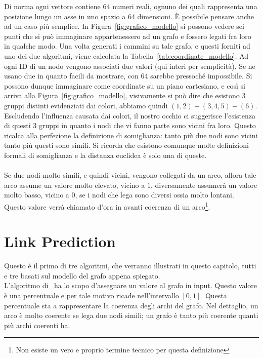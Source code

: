 Di norma ogni vettore contiene $64$ numeri reali, ognuno dei quali rappresenta una posizione lungo un asse in uno spazio a $64$ dimensioni. È possibile pensare anche ad un caso più semplice. In Figura~\ref{fig:grafico_modello} si possono vedere sei punti che si può immaginare appartenessero ad un grafo e fossero legati fra loro in qualche modo. Una volta generati i cammini su tale grafo, e questi forniti ad uno dei due algoritmi, viene calcolata la Tabella~\ref{tab:coordinate_modello}. Ad ogni ID di un nodo vengono associati due valori (qui interi per semplicità). Se ne usano due in quanto facili da mostrare, con $64$ sarebbe pressoché impossibile. Si possono dunque immaginare come coordinate su un piano cartesiano, e così si arriva alla Figura~\ref{fig:grafico_modello}, visivamente si può dire che esistono 3 gruppi distinti evidenziati dai colori, abbiamo quindi $(1, 2) - (3, 4, 5) - (6)$.\\
Escludendo l'influenza causata dai colori, il nostro occhio ci suggerisce l'esistenza di questi 3 gruppi in quanto i nodi che vi fanno parte sono vicini fra loro. Questo ricalca alla perfezione la definizione di somiglianza: tanto più due nodi sono vicini tanto più questi sono simili. Si ricorda che esistono comunque molte definizioni formali di somiglianza e la distanza euclidea è solo una di queste.\\
\\
Se due nodi molto simili, e quindi vicini, vengono collegati da un arco, allora tale arco assume un valore molto elevato, vicino a $1$, diversamente assumerà un valore molto basso, vicino a $0$, se i nodi che lega sono diversi ossia molto lontani.\\
Questo valore verrà chiamato d'ora in avanti coerenza di un arco\footnote{Non esiste un vero e proprio termine tecnico per questa definizione}.
%
\section{Link Prediction}
Questo è il primo di tre algoritmi, che verranno illustrati in questo capitolo, tutti e tre basati sul modello del grafo appena spiegato.\\
L'algoritmo di \LPred\ ha lo scopo d'assegnare un valore al grafo in input. Questo valore è una percentuale e per tale motivo ricade nell'intervallo $[0, 1]$. Questa percentuale sta a rappresentare la coerenza degli archi del grafo. Nel dettaglio, un arco è molto coerente se lega due nodi simili; un grafo è tanto più coerente quanti più archi coerenti ha.
%
